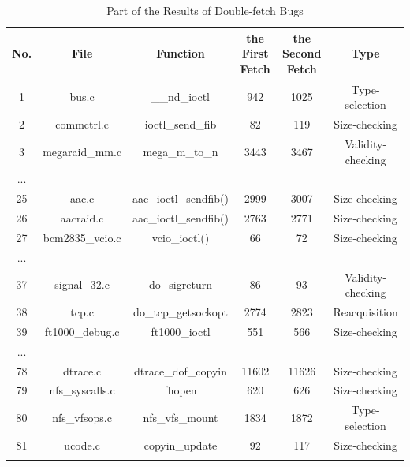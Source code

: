 \documentclass[10pt]{llncs}
\begin{document}
\begin{table}[htb!]
  \centering
  \caption{Part of the Results of Double-fetch Bugs}
  \begin{tabular}{cccccc}
    \hline
    No. & File & Function & the First Fetch & the Second Fetch & Type  \\  
    \hline
    1 & bus.c & \_\_nd\_ioctl & 942 & 1025 & Type-selection \\
2 & commctrl.c & ioctl\_send\_fib & 82 & 119 & Size-checking \\
3 & megaraid\_mm.c & mega\_m\_to\_n & 3443 & 3467 & Validity-checking \\
	...\\ 
	\hline
25 & aac.c  & aac\_ioctl\_sendfib() & 2999 & 3007 & Size-checking \\
26 & aacraid.c  & aac\_ioctl\_sendfib() & 2763 & 2771 & Size-checking \\
27 & bcm2835\_vcio.c  & vcio\_ioctl() & 66 & 72 & Size-checking \\
...\\
\hline
37 & signal\_32.c & do\_sigreturn & 86 & 93 & Validity-checking \\
38 & tcp.c & do\_tcp\_getsockopt & 2774 & 2823 & Reacquisition \\
39 & ft1000\_debug.c & ft1000\_ioctl & 551 & 566 & Size-checking \\
...\\
	\hline
78 & dtrace.c & dtrace\_dof\_copyin & 11602 & 11626 & Size-checking \\
79 & nfs\_syscalls.c & fhopen & 620 & 626 & Size-checking \\
80 & nfs\_vfsops.c & nfs\_vfs\_mount & 1834 & 1872 & Type-selection \\
81 & ucode.c & copyin\_update & 92 & 117 & Size-checking \\
\hline
    \label{result}
  \end{tabular}
\end{table}
\end{document}
